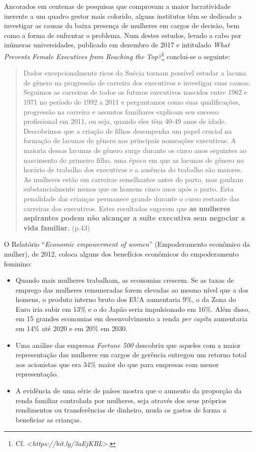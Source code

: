 Ancorados em centenas de pesquisas que comprovam a maior lucratividade
inerente a um quadro gestor mais colorido, alguns institutos têm se
dedicado a investigar as causas da baixa presença de mulheres em cargos
de decisão, bem como a forma de enfrentar o problema. Num destes
estudos, levado a cabo por inúmeras universidades, publicado em dezembro
de 2017 e intitulado \emph{What Prevents Female Executives from Reaching
the Top?}\footnote{Cf. \textless{}\emph{https://bit.ly/3aEjKBL}\textgreater{}.}
conclui-se o seguinte:

\begin{quote}
Dados excepcionalmente ricos da Suécia tornam possível estudar a lacuna
de gênero na progressão de carreira dos executivos e investigar suas
causas. Seguimos as carreiras de todos os futuros executivos nascidos
entre 1962 e 1971 no período de 1992 a 2011 e perguntamos como suas
qualificações, progressão na carreira e assuntos familiares explicam seu
sucesso profissional em 2011, ou seja, quando eles têm 40-49 anos de
idade. Descobrimos que a criação de filhos desempenha um papel crucial
na formação de lacunas de gênero nas principais nomeações executivas. A
maioria dessas lacunas de gênero surge durante os cinco anos seguintes
ao nascimento do primeiro filho, uma época em que as lacunas de gênero
no horário de trabalho dos executivos e a ausência do trabalho são
maiores. As mulheres estão em carreiras semelhantes antes do parto, mas
ganham substancialmente menos que os homens cinco anos após o parto.
Esta penalidade das crianças permanece grande durante o curso restante
das carreiras dos executivos. Estes resultados sugerem que \textbf{as
mulheres aspirantes podem não alcançar a suíte executiva sem negociar a
vida familiar.} (p.43)
\end{quote}

O Relatório ``\emph{Economic empowerment of women}'' (Empoderamento
econômico da mulher), de 2012, coloca alguns dos benefícios econômicos
do empoderamento feminino:

\begin{itemize}

\item Quando mais mulheres trabalham, as economias crescem. Se as taxas de
emprego das mulheres remuneradas forem elevadas ao mesmo nível que a dos
homens, o produto interno bruto dos EUA aumentaria 9\%, o da Zona do
Euro iria subir em 13\% e o do Japão seria impulsionado em 16\%. Além
disso, em 15 grandes economias em desenvolvimento a renda \emph{per
capita} aumentaria em 14\% até 2020 e em 20\% em 2030.

\item Uma análise das empresas \emph{Fortune 500} descobriu que aqueles com
a maior representação das mulheres em cargos de gerência entregou um
retorno total aos acionistas que era 34\% maior do que para empresas com
menor representação.

\item A evidência de uma série de países mostra que o aumento da proporção
da renda familiar controlada por mulheres, seja através dos seus
próprios rendimentos ou transferências de dinheiro, muda os gastos de
forma a beneficiar as crianças.
\end{itemize}

